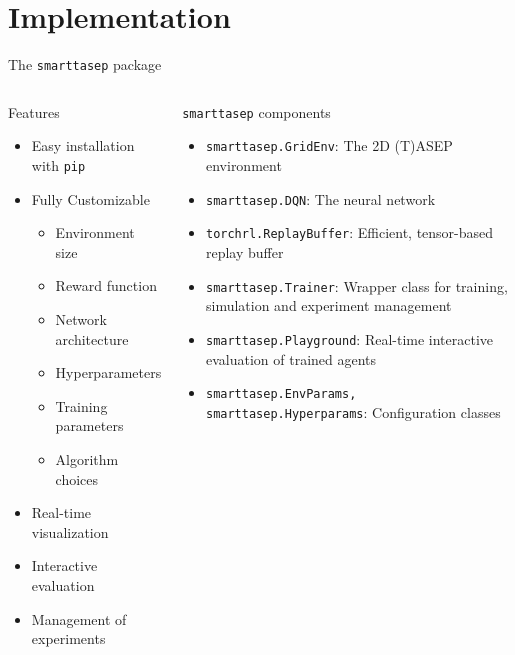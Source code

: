 \documentclass[10pt,xcolor=table, aspectratio=1610]{beamer}
\begin{document}
\section{Implementation}
\begin{frame}{The \texttt{smarttasep} package}
    \begin{columns}
      \begin{block}{Features}
        \begin{itemize}
          \item Easy installation with \texttt{pip}
          \item Fully Customizable
          \begin{itemize}
            \item Environment size
            \item Reward function
            \item Network architecture
            \item Hyperparameters
            \item Training parameters
            \item Algorithm choices
          \end{itemize}
          \item Real-time visualization
          \item Interactive evaluation
          \item Management of experiments
        \end{itemize}
      \end{block}
      \begin{block}{\texttt{smarttasep} components}
        \begin{itemize}
          \item \texttt{smarttasep.GridEnv}: The 2D (T)ASEP environment
          \item \texttt{smarttasep.DQN}: The neural network
          \item \texttt{torchrl.ReplayBuffer}: Efficient, tensor-based replay buffer
          \item \texttt{smarttasep.Trainer}: Wrapper class for training, simulation and experiment management
          \item \texttt{smarttasep.Playground}: Real-time interactive evaluation of trained agents
          \item \texttt{smarttasep.EnvParams, smarttasep.Hyperparams}: Configuration classes
        \end{itemize}    
      \end{block}
    \end{columns}
\end{frame}
\end{document}
